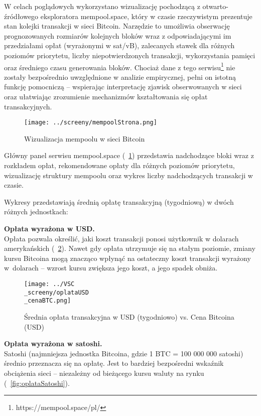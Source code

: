 \documentclass[12pt,a4paper]{report}
\theoremstyle{definition} %
\begin{document}
	W celach poglądowych wykorzystano wizualizację pochodzącą z otwarto-źródłowego eksploratora mempool.space, który w czasie rzeczywistym prezentuje stan kolejki transakcji w sieci Bitcoin. Narzędzie to umożliwia obserwację prognozowanych rozmiarów kolejnych bloków wraz z odpowiadającymi im przedziałami opłat (wyrażonymi w sat/vB), zalecanych stawek dla różnych poziomów priorytetu, liczby niepotwierdzonych transakcji, wykorzystania pamięci oraz średniego czasu generowania bloków. Chociaż dane z tego serwisu\footnote{https://mempool.space/pl/} nie zostały bezpośrednio uwzględnione w analizie empirycznej, pełni on istotną funkcję pomocniczą – wspierając interpretację zjawisk obserwowanych w sieci oraz ułatwiając zrozumienie mechanizmów kształtowania się opłat transakcyjnych.
	\begin{figure}[H]
	    \centering
	    \texttt{[image: ../screeny/mempoolStrona.png]} 
	    \caption{Wizualizacja mempoolu w sieci Bitcoin}
	    \label{fig:mempoolStrona}
	\end{figure}
Główny panel serwisu mempool.space (\figurename~\ref{fig:mempoolStrona}) przedstawia nadchodzące bloki wraz z rozkładem opłat, rekomendowane opłaty dla różnych poziomów priorytetu, wizualizację struktury mempoolu oraz wykres liczby nadchodzących transakcji w czasie.

	\noindent Wykresy przedstawiają średnią opłatę transakcyjną (tygodniową) w dwóch różnych jednostkach:

	\noindent \textbf{Opłata wyrażona w USD.}\\
	\hspace*{\parindent}Opłata pozwala określić, jaki koszt transakcji ponosi użytkownik w dolarach amerykańskich (\figurename~\ref{fig:oplataUSD}). Nawet gdy opłata utrzymuje się na stałym poziomie, zmiany kursu Bitcoina mogą znacząco wpłynąć na ostateczny koszt transakcji wyrażony w~dolarach – wzrost kursu zwiększa jego koszt, a jego spadek obniża.

	\begin{figure}[H]
	    \centering
	    \texttt{[image: ../VSC\\\_screeny/oplataUSD\\\_cenaBTC.png]} 
	    \caption{Średnia opłata transakcyjna w USD (tygodniowo) vs. Cena Bitcoina (USD)}
	    \label{fig:oplataUSD}
	\end{figure}

	\noindent \textbf{Opłata wyrażona w satoshi.}\\
	\hspace*{\parindent}Satoshi (najmniejsza jednostka Bitcoina, gdzie 1 BTC = 100 000 000 satoshi) średnio przeznacza się na opłatę. Jest to bardziej bezpośredni wskaźnik obciążenia sieci – niezależny od bieżącego kursu waluty na rynku (\figurename~\ref{fig:oplataSatoshi}). 
	
\end{document}
